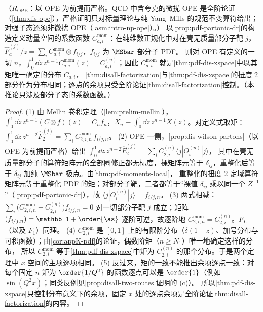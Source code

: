 \begin{corollary}\label{cor:disall-consistency}
（$R_{\mathrm{OPE}}$：以 OPE 为前提而严格。QCD 中含夸克的微扰 OPE 是全阶论证（\cref{thm:dis-ope}），严格证明只对标量理论与纯 Yang--Mills 的规范不变算符给出；对强子态还须非微扰 OPE（\cref{asm:intro-np-ope}）。）
以\cref{prop:pdf-partonic-dr}的构造定义动量空间的系数函数 $C^{\mathrm{mom}}_{a,i}$：在纯维数正规化中对在壳无质量部分子靶 $j$，$\hat F^{(j)}_a/z=\sum_iC^{\mathrm{mom}}_{a,i}\otimes f_{i/j}$，$f_{i/j}$ 为 $\MSbar$ 部分子 PDF。
则对 OPE 有定义的一切 $n$，$\int_0^1\dd z\,z^{n-1}C^{\mathrm{mom}}_{a,i}(z)=C^{(n)}_{a,i}$；因此 $C^{\mathrm{mom}}_{a,i}$ 就是\cref{thm:pdf-dis-xspace}中以其矩唯一确定的分布 $C_{a,i}$，
\cref{thm:disall-factorization}与\cref{thm:pdf-dis-xspace}的扭度 2 部分作为分布相同；逐点的余项只受全阶论证\cref{thm:disall-factorization}控制。（本推论只涉及部分子态的系数函数。）
\end{corollary}

\begin{proof}
(1) 由 Mellin 卷积定理（\cref{lem:prelim-mellin}），$\int_0^1\dd z\,z^{n-1}(C\otimes f)(z)=C_nf_n$，$X_n\equiv\int_0^1\dd z\,z^{n-1}X(z)$。对定义式取矩：
$\int_0^1\dd z\,z^{n-2}\hat F^{(j)}_2=\sum_iC^{\mathrm{mom}}_{2,i,n}\,f_{i/j,n}$。
(2) OPE 一侧，\cref{prop:dis-wilson-partons}（以 OPE 为前提而严格）给出 $\int_0^1\dd z\,z^{n-2}\hat F^{(j)}_2=\sum_iC^{(n)}_{2,i}\langle j|O^{(n)}_i|j\rangle$，
其中在壳无质量部分子的算符矩阵元的全部圈修正都无标度，裸矩阵元等于 $\delta_{ij}$，重整化后等于 $\delta_{ij}$ 加纯 $\MSbar$ 极点。由\cref{thm:pdf-moments-local}，
重整化的扭度 2 定域算符矩阵元等于重整化 PDF 的矩；对部分子靶，二者都等于“裸值 $\delta_{ij}$ 乘以同一个 $Z^{-1}$”（\cref{prop:pdf-partonic-dr}），故 $\langle j|O^{(n)}_i|j\rangle=f_{i/j,n}$。
(3) 两式相减：$\sum_i\big(C^{\mathrm{mom}}_{2,i,n}-C^{(n)}_{2,i}\big)f_{i/j,n}=0$ 对一切部分子靶 $j$ 成立；矩阵 $(f_{i/j,n})=\mathbb 1+\order{\as}$ 逐阶可逆，故逐阶地 $C^{\mathrm{mom}}_{2,i,n}=C^{(n)}_{2,i}$。$F_L$（以及 $F_1$）同理。
(4) $C^{\mathrm{mom}}_{2,i}$ 是 $[0,1]$ 上的有限阶分布（$\delta(1-z)$、加号分布与可积函数）；由\cref{cor:appK-pdf}的论证，偶数阶矩（$n\ge N_1$）唯一地确定这样的分布，
所以 $C^{\mathrm{mom}}_{2,i}$ 等于\cref{thm:pdf-dis-xspace}中矩为 $C^{(n)}_{2,i}$ 的那个分布。于是两个定理中 $x$ 空间的主项逐项相同。
(5) 反过来，矩的一致不能推出余项逐点一致：对每个固定 $n$ 矩为 $\order{1/Q^2}$ 的函数逐点可以是 $\order{1}$（例如 $\sin(Q^2x)$；同类反例见\cref{prop:disall-two-routes}证明的 (c)）。
所以\cref{thm:pdf-dis-xspace}只控制分布意义下的余项，固定 $x$ 处的逐点余项是全阶论证\cref{thm:disall-factorization}的内容。
\end{proof}

